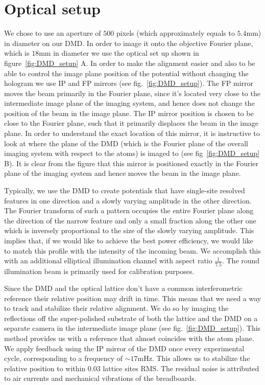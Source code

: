\section{Optical setup}
We chose to use an aperture of $500$ pixels (which approximately equals to $5.4 \mathrm{mm}$) in diameter on our DMD. In order to image it onto the objective Fourier plane, which is $18 \mathrm{mm}$ in diameter we use the optical set up shown in figure~\ref{fig:DMD_setup} A. In order to make the alignment easier and also to be able to control the image plane position of the potential without changing the hologram we use IP and FP mirrors (see fig.~\ref{fig:DMD_setup}). The FP mirror moves the beam primarily in the Fourier plane, since it's located very close to the intermediate image plane of the imaging system, and hence does not change the position of the beam in the image plane. The IP mirror position is chosen to be close to the Fourier plane, such that it primarily displaces the beam in the image plane. In order to understand the exact location of this mirror, it is instructive to look at where the plane of the DMD (which is the Fourier plane of the overall imaging system with respect to the atoms) is imaged to (see fig~\ref{fig:DMD_setup} B). It is clear from the figure that this mirror is positioned exactly in the Fourier plane of the imaging system and hence moves the beam in the image plane.

Typically, we use the DMD to create potentials that have single-site resolved features in one direction and a slowly varying amplitude in the other direction. The Fourier transform of such a pattern occupies the entire Fourier plane along the direction of the narrow feature and only a small fraction along the other one which is inversely proportional to the size of the slowly varying amplitude. This implies that, if we would like to achieve the best power efficiency, we would like to match this profile with the intensity of the incoming beam. We accomplish this with an additional elliptical illumination channel with aspect ratio $\frac{1}{7.5}$. The round illumination beam is primarily used for calibration purposes.

Since the DMD and the optical lattice don't have a common interferometric reference their relative position may drift in time. This means that we need a way to track and stabilize their relative alignment. We do so by imaging the reflections off the super-polished substrate of both the lattice and the DMD on a separate camera in the intermediate image plane (see fig.~\ref{fig:DMD_setup}). This method provides us with a reference that almost coincides with the atom plane. We apply feedback using the IP mirror of the DMD once every experimental cycle, corresponding to a frequency of $\sim 17 \mathrm{mHz}$. This allows us to stabilize the relative position to within $0.03$ lattice sites RMS. The residual noise is attributed to air currents and mechanical vibrations of the breadboards.

